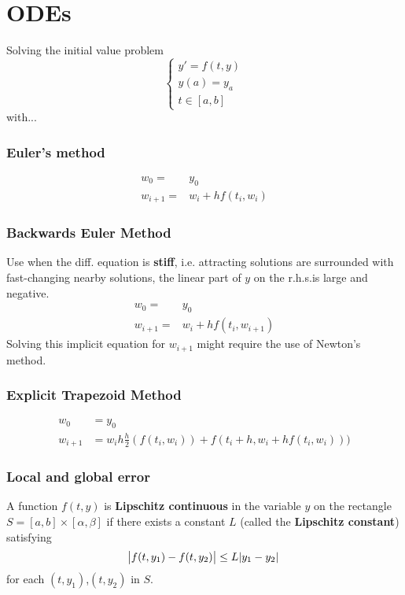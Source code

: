 \section{ODEs}
Solving the initial value problem
$$
\begin{cases}
y' = f(t,y) \\
y(a) = y_a \\
t \in [a,b]
\end{cases}
$$
with...
\subsubsection{Euler's method}
\begin{align*}
w_0 = & y_0 \\
w_{i+1} = & w_{i} + h f(t_i, w_i)
\end{align*}

\subsubsection{Backwards Euler Method}
Use when the diff. equation is \textbf{stiff}, i.e. attracting solutions are surrounded with fast-changing nearby solutions, the linear part of $y$ on the r.h.s.is large and negative.
\begin{align*}
w_0 = &y_0 \\
w_{i+1} = & w_{i} + h f(t_i, w_{i+1})
\end{align*}
Solving this implicit equation for $w_{i+1}$ might require the use of Newton's method.
 
\subsubsection{Explicit Trapezoid Method}
\begin{align*}
w_0 &= y_0 \\
w_{i+1} &= w_i h \frac{h}{2}(f(t_i,w_i)) + f(t_i + h, w_i + hf(t_i,w_i)))
\end{align*}

\subsubsection{Local and global error}
\begin{definition}
A function $f(t,y)$ is \textbf{Lipschitz continuous} in the variable $y$ on the rectangle $S = [a,b] \times [\alpha, \beta]$ if there exists a constant $L$ (called the \textbf{Lipschitz constant}) satisfying
$$
\abs{f(t,y_1) - f(t,y_2)} \leq L\abs{y_1 - y_2}
$$
for each $(t,y_1)$,$(t,y_2)$ in $S$.
\end{definition}

